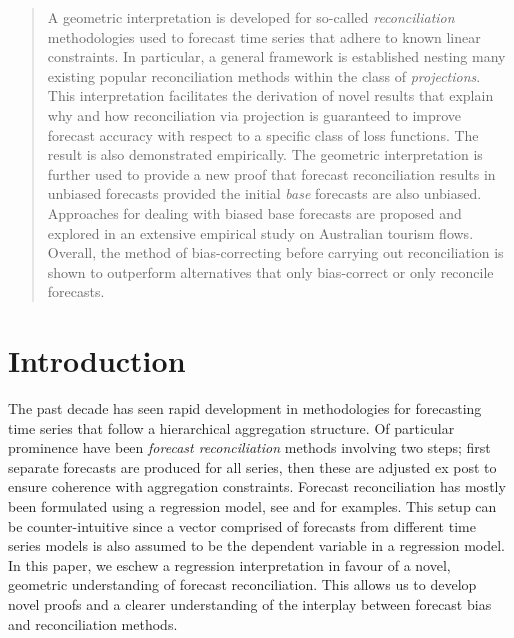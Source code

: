 \documentclass[12pt]{article}
\theoremstyle{definition}
\def\spacingset#1{\renewcommand{\baselinestretch}%
    {#1}\small\normalsize} \spacingset{1}
\begin{document}
\begin{abstract}
\spacingset{1.45}
  A geometric interpretation is developed for so-called \emph{reconciliation} methodologies used to forecast time series that adhere to known linear constraints. In particular, a general framework is established nesting many existing popular reconciliation methods within the class of \emph{projections}. This interpretation facilitates the derivation of novel results that explain why and how reconciliation via projection is guaranteed to improve forecast accuracy with respect to a specific class of loss functions. The result is also demonstrated empirically. The geometric interpretation is further used to provide a new proof that forecast reconciliation results in unbiased forecasts provided the initial \emph{base} forecasts are also unbiased. Approaches for dealing with biased base forecasts are proposed and explored in an extensive empirical study on Australian tourism flows. Overall, the method of bias-correcting before carrying out reconciliation is shown to outperform alternatives that only bias-correct or only reconcile forecasts.

\end{abstract}
	
	
	\newpage
	\spacingset{1.45} %
	
	\section{Introduction}\label{sec:intro}
	
	The past decade has seen rapid development in methodologies for forecasting time series that follow a hierarchical aggregation structure.  Of particular prominence have been {\em forecast reconciliation} methods involving two steps; first separate forecasts are produced for all series, then these are adjusted ex post to ensure coherence with aggregation constraints.  Forecast reconciliation has mostly been formulated using a regression model, see \cite{Hyndman2011} and \cite{WicEtAl2019} for examples.  This setup can be counter-intuitive since a vector comprised of forecasts from different time series models is also assumed to be the dependent variable in a regression model.  In this paper, we eschew a regression interpretation in favour of a novel, geometric understanding of forecast reconciliation.  This allows us to develop novel proofs and a clearer understanding of the interplay between forecast bias and reconciliation methods.
	
\end{document}
